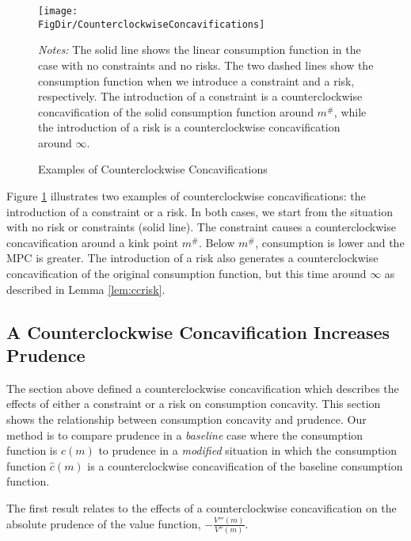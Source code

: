   \hypertarget{CounterclockwiseConcavifications}{}

  \begin{figure}[ht]
    {\centering
      \texttt{[image: \\FigDir/CounterclockwiseConcavifications]}}
    \caption{Examples of Counterclockwise Concavifications}
    {\footnotesize \begin{singlespace} {\emph{Notes:} The solid line shows the linear consumption function in the case with no constraints and no risks. The two dashed lines show the consumption function when we introduce a constraint and a risk, respectively. The introduction of a constraint is a counterclockwise concavification of the solid consumption function around ${m}^{\#}$, while the introduction of a risk is a counterclockwise concavification around $\infty$.}  \end{singlespace}}
    \label{fig:counterclockwise}
  \end{figure}

  \noindent Figure \ref{fig:counterclockwise} illustrates two examples of counterclockwise concavifications: the introduction of a constraint or a risk. In both cases, we start from the situation with no risk or constraints (solid line). The constraint causes a counterclockwise concavification around a kink point ${m}^{\#}$. Below ${m}^{\#}$, consumption is lower and the MPC is greater. The introduction of a risk also generates a counterclockwise concavification of the original consumption function, but this time around $\infty$ as described in Lemma \ref{lem:ccrisk}. %

  \subsection{A Counterclockwise Concavification Increases Prudence}\label{sec:CCPrud}
  The section above defined a counterclockwise concavification which describes the effects of either a constraint or a risk on consumption concavity. This section shows the relationship between consumption concavity and prudence. Our method is to compare prudence in a \textit{baseline} case where the consumption function is $c({m})$ to prudence in a \textit{modified} situation in which the consumption function $\hat{c}({m})$ is a counterclockwise concavification of the baseline consumption function.

  The first result relates to the effects of a counterclockwise concavification on the absolute prudence of the value function, $-\frac{V'''({m})}{V''({m})}$.


